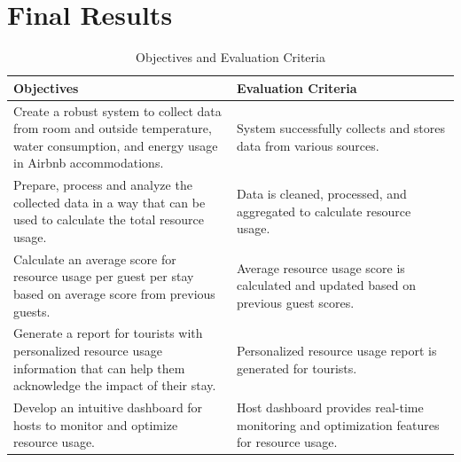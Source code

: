 
\chapter{Final Results}


\begin{table}[htbp]
    \centering
    \caption{Objectives and Evaluation Criteria}
    \begin{tabular}{|p{0.5\linewidth}|p{0.5\linewidth}|}
        \hline
        \textbf{Objectives} & \textbf{Evaluation Criteria} \\
        \hline
        Create a robust system to collect data from room and outside temperature, water consumption, and energy usage in Airbnb accommodations. & System successfully collects and stores data from various sources. \\
        \hline
        Prepare, process and analyze the collected data in a way that can be used to calculate the total resource usage. & Data is cleaned, processed, and aggregated to calculate resource usage. \\
        \hline
        Calculate an average score for resource usage per guest per stay based on average score from previous guests. & Average resource usage score is calculated and updated based on previous guest scores. \\
        \hline
        Generate a report for tourists with personalized resource usage information that can help them acknowledge the impact of their stay. & Personalized resource usage report is generated for tourists. \\
        \hline
        Develop an intuitive dashboard for hosts to monitor and optimize resource usage. & Host dashboard provides real-time monitoring and optimization features for resource usage. \\
        \hline
    \end{tabular}
\end{table}